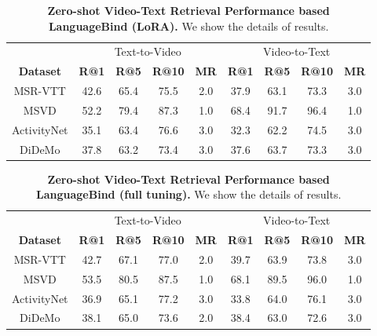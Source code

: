 \documentclass{article} \usepackage{iclr2024_conference,times}
\begin{document}
\begin{table*}[htbp]
\small
\caption{ \textbf{Zero-shot Video-Text Retrieval Performance based LanguageBind (LoRA).} We show the details of results.}
\label{tab:retrieval_lb_details}
\centering
\setlength\tabcolsep{1.5mm}
\begin{tabular}{c|cccc|cccc}
        \toprule
         & \multicolumn{4}{c}{Text-to-Video} & \multicolumn{4}{c}{Video-to-Text} \\
        \textbf{Dataset}  &\textbf{R@1} & \textbf{R@5} & \textbf{R@10} & \textbf{MR}  &\textbf{R@1} & \textbf{R@5} & \textbf{R@10} & \textbf{MR} \\
        \midrule
        MSR-VTT  & 42.6 & 65.4 & 75.5 & 2.0 & 37.9 & 63.1 & 73.3 & 3.0 \\  
        MSVD  &  52.2 & 79.4 & 87.3 & 1.0 & 68.4 & 91.7 & 96.4 &  1.0\\  
        ActivityNet  & 35.1  & 63.4 & 76.6 & 3.0 & 32.3 & 62.2 & 74.5 & 3.0 \\  
        DiDeMo  &  37.8 & 63.2 & 73.4 & 3.0 & 37.6 & 63.7 & 73.3 &  3.0 \\  
      \bottomrule
      \end{tabular}
\end{table*} 

\begin{table*}[htbp]
\small
\caption{ \textbf{Zero-shot Video-Text Retrieval Performance based LanguageBind (full tuning).} We show the details of results.}
\label{tab:retrieval_lb_details}
\centering
\setlength\tabcolsep{1.5mm}
\begin{tabular}{c|cccc|cccc}
        \toprule
         & \multicolumn{4}{c}{Text-to-Video} & \multicolumn{4}{c}{Video-to-Text} \\
        \textbf{Dataset}  &\textbf{R@1} & \textbf{R@5} & \textbf{R@10} & \textbf{MR}  &\textbf{R@1} & \textbf{R@5} & \textbf{R@10} & \textbf{MR} \\
        \midrule
        MSR-VTT  & 42.7 & 67.1 & 77.0 & 2.0 & 39.7 & 63.9 & 73.8 & 3.0 \\  
        MSVD  & 53.5 & 80.5 & 87.5 & 1.0 & 68.1 & 89.5 & 96.0 & 1.0 \\ 
        ActivityNet  & 36.9 & 65.1 & 77.2 & 3.0 & 33.8 & 64.0 & 76.1 & 3.0 \\ 
        DiDeMo  & 38.1 & 65.0 & 73.6 & 2.0 & 38.4 & 63.0 & 72.6 & 3.0 \\ 
      \bottomrule
      \end{tabular}
\end{table*} 
\end{document}

